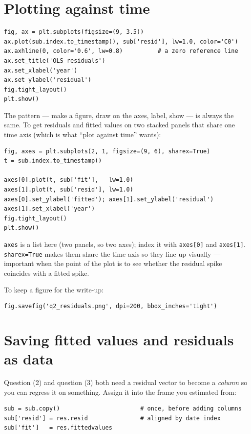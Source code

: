 \documentclass[11pt]{article}
\newcommand{\code}[1]{\texttt{#1}}
\begin{document}
\section{Plotting against time}

\begin{lstlisting}
fig, ax = plt.subplots(figsize=(9, 3.5))
ax.plot(sub.index.to_timestamp(), sub['resid'], lw=1.0, color='C0')
ax.axhline(0, color='0.6', lw=0.8)          # a zero reference line
ax.set_title('OLS residuals')
ax.set_xlabel('year')
ax.set_ylabel('residual')
fig.tight_layout()
plt.show()
\end{lstlisting}

\noindent The pattern --- make a figure, draw on the axes, label, show --- is
always the same. To get residuals and fitted values on two stacked panels that
share one time axis (which is what ``plot against time'' wants):

\begin{lstlisting}
fig, axes = plt.subplots(2, 1, figsize=(9, 6), sharex=True)
t = sub.index.to_timestamp()

axes[0].plot(t, sub['fit'],   lw=1.0)
axes[1].plot(t, sub['resid'], lw=1.0)
axes[0].set_ylabel('fitted'); axes[1].set_ylabel('residual')
axes[1].set_xlabel('year')
fig.tight_layout()
plt.show()
\end{lstlisting}

\noindent\code{axes} is a list here (two panels, so two axes); index it with
\code{axes[0]} and \code{axes[1]}. \code{sharex=True} makes them share the time
axis so they line up visually --- important when the point of the plot is to see
whether the residual spike coincides with a fitted spike.

\noindent To keep a figure for the write-up:

\begin{lstlisting}
fig.savefig('q2_residuals.png', dpi=200, bbox_inches='tight')
\end{lstlisting}

\section{Saving fitted values and residuals as data}

Question (2) and question (3) both need a residual vector to become a
\emph{column} so you can regress it on something. Assign it into the frame you
estimated from:

\begin{lstlisting}
sub = sub.copy()                       # once, before adding columns
sub['resid'] = res.resid               # aligned by date index
sub['fit']   = res.fittedvalues
\end{lstlisting}
\end{document}
